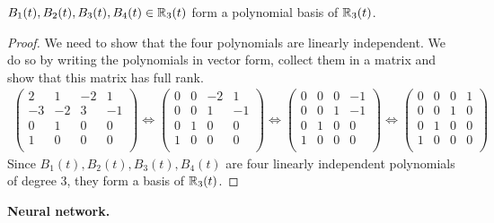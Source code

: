 \begin{theorem}
$B_1(t), B_2(t), B_3(t), B_4(t) \in \mathbb{R}_3(t)$ form a polynomial basis of $\mathbb{R}_3(t)$.
\end{theorem}
\begin{proof}
We need to show that the four polynomials are linearly independent. We do so by writing the polynomials in vector form, collect them in a matrix and show that this matrix has full rank. 
\begin{align*}
\begin{pmatrix}
2 & 1 & -2 & 1\\
-3 & -2 & 3 & -1 \\
0 & 1 & 0 & 0 \\
1 & 0 & 0 & 0 \\
\end{pmatrix}
\Leftrightarrow
\begin{pmatrix}
0 & 0 & -2 & 1\\
0 & 0 & 1 & -1 \\
0 & 1 & 0 & 0 \\
1 & 0 & 0 & 0 \\
\end{pmatrix}
\Leftrightarrow
\begin{pmatrix}
0 & 0 & 0 & -1\\
0 & 0 & 1 & -1 \\
0 & 1 & 0 & 0 \\
1 & 0 & 0 & 0 \\
\end{pmatrix}
\Leftrightarrow
\begin{pmatrix}
0 & 0 & 0 & 1\\
0 & 0 & 1 & 0 \\
0 & 1 & 0 & 0 \\
1 & 0 & 0 & 0 \\
\end{pmatrix}
\end{align*}
Since $B_1(t), B_2(t), B_3(t), B_4(t)$ are four linearly independent polynomials of degree 3, they form a basis of $\mathbb{R}_3(t)$. 
\end{proof} 

\textbf{Neural network.} 

 

